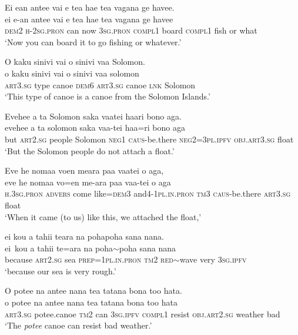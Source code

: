\ea\label{ex:text18-46}
Ei ean antee vai e tea hae tea vagana ge havee.\\
\gll ei	e-an	antee	vai	e	tea	hae	tea	vagana	ge	havee\\
     \textsc{dem}2	\textsc{h}-2\textsc{sg}.\textsc{pron}	can	now	3\textsc{sg}.\textsc{pron}	\textsc{compl}1	board	\textsc{compl}1	fish	or	what\\
\glt `Now you can board it to go fishing or whatever.'
\z

\ea\label{ex:text18-47}
O kaku sinivi vai o sinivi vaa Solomon.\\
\gll o	kaku	sinivi	vai	o	sinivi	vaa	solomon\\
     \textsc{art}3.\textsc{sg}	type	canoe	\textsc{dem}6	\textsc{art}3.\textsc{sg}	canoe	\textsc{lnk}	Solomon\\
\glt `This type of canoe is a canoe from the Solomon Islands.'
\z

\ea\label{ex:text18-48}
Evehee a ta Solomon saka vaatei haari bono aga.\\
\gll evehee	a	ta	solomon	saka	vaa-tei	haa=ri	bono	aga\\
     but	\textsc{art}2.\textsc{sg}	people	Solomon	\textsc{neg}1	\textsc{caus}-be.there	\textsc{neg}2=3\textsc{pl}.\textsc{ipfv}	\textsc{obj}.\textsc{art}3.\textsc{sg}	float\\
\glt `But the Solomon people do not attach a float.'
\z

\ea\label{ex:text18-49}
Eve he nomaa voen meara paa vaatei o aga,\\
\gll eve	he	nomaa	vo=en	me-ara	paa	vaa-tei	o	aga\\
     \textsc{h}.3\textsc{sg}.\textsc{pron}	\textsc{advers}	come	like=\textsc{dem}3	and4-1\textsc{pl}.\textsc{in}.\textsc{pron}	\textsc{tm}3	\textsc{caus}-be.there	\textsc{art}3.\textsc{sg}	float\\
\glt `When it came (to us) like this, we attached the float,'
\z

\newpage
\ea\label{ex:text18-50}
ei kou a tahii teara na pohapoha sana nana.\\
\gll ei~kou	a	tahii	te=ara	na	poha{$\sim$}poha	sana	nana\\
     because	\textsc{art}2.\textsc{sg}	sea	\textsc{prep}=1\textsc{pl}.\textsc{in}.\textsc{pron}	\textsc{tm}2	\textsc{red}{$\sim$}wave	very	3\textsc{sg}.\textsc{ipfv}\\
\glt `because our sea is very rough.'
\z

\ea\label{ex:text18-51}
O potee na antee nana tea tatana bona too hata.\\
\gll o	potee	na	antee	nana	tea	tatana	bona	too	hata\\
     \textsc{art}3.\textsc{sg}	potee.canoe	\textsc{tm}2	can	3\textsc{sg}.\textsc{ipfv}	\textsc{compl}1	resist	\textsc{obj}.\textsc{art}2.\textsc{sg}	weather	bad\\
\glt `The \textit{potee} canoe can resist bad weather.'
\z


